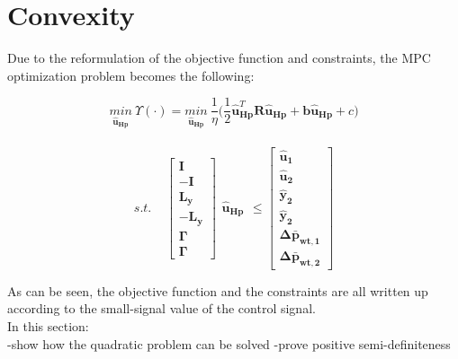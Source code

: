 \section{Convexity}
\label{convexity}

Due to the reformulation of the objective function and constraints, the MPC optimization problem becomes the following: 

\begin{equation}
\underset{\bm{\hat{u}_{Hp}}}{min} \:  \Upsilon(\cdot) = \underset{\bm{\hat{u}_{Hp}}}{min} \:  \frac{1}{\eta}\bigg( \frac{1}{2} \bm{\hat{u}}_{\bm{Hp}}^{T} \bm{R} \bm{\hat{u}}_{\bm{Hp}} + \bm{b} \bm{\hat{u}}_{\bm{Hp}} + c \bigg)
\label{eq:obj_final}
\end{equation}
\\
\newline
\begin{equation}
s.t. \:\:\:\:\:	\begin{bmatrix}
		\bm{I} 	\\
		-\bm{I} 	\\
		\bm{L_{y}}	\\
		-\bm{L_{y}}	\\
		\bm{\Gamma}	\\
		\bm{\Gamma}
	\end{bmatrix}
	\begin{matrix}
			\bm{\hat{u}_{Hp}}
	\end{matrix}
	\leq 
	\begin{bmatrix}
			\bm{\hat{u}_{1}}	\\
			\bm{\hat{u}_{2}}	\\
			\bm{\hat{y}_{2}}	\\
			\bm{\hat{y}_{2}}	\\
			\bm{\Delta \bar{p}_{wt,1}}	\\
			\bm{\Delta \bar{p}_{wt,2}}	
	\end{bmatrix}
\end{equation}

As can be seen, the objective function and the constraints are all written up according to the small-signal value of the control signal. 
\\
\newline
In this section:
\\
-show how the quadratic problem can be solved
-prove positive semi-definiteness
